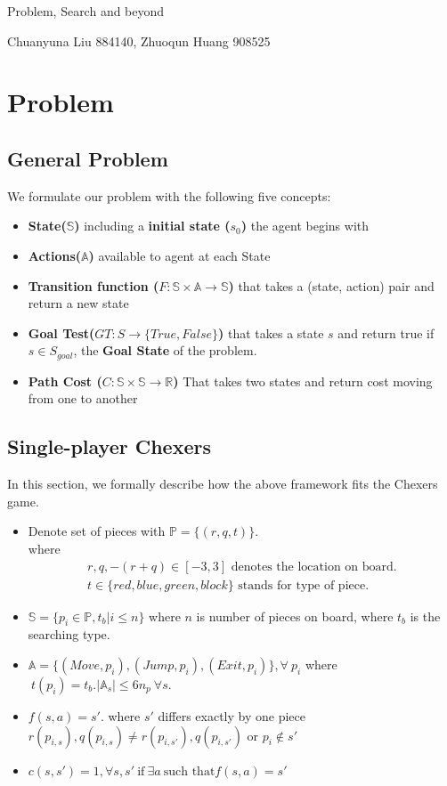 \documentclass[12pt,a4paper]{article}
\begin{document}
    \begin{center}
        \large Problem, Search and beyond
        
        \normalsize Chuanyuna Liu 884140, Zhuoqun Huang 908525
    \end{center}
    \section{Problem}
    \subsection{General Problem}
    We formulate our problem with the following five concepts:
    \begin{itemize}
        \item \textbf{State($\mathbb{S}$)} including a \textbf{initial state ($s_0$)} the agent begins with
        \item \textbf{Actions($\mathbb{A}$)} available to agent at each State
        \item \textbf{Transition function ($F:\mathbb{S}\times \mathbb{A}\rightarrow \mathbb{S}$)} that takes a (state, action) pair and return a new state
        \item \textbf{Goal Test($GT:S\rightarrow \{True, False\}$)} that takes a state $s$ and return true if $s\in S_{goal}$, the \textbf{Goal State} of the problem.
        \item \textbf{Path Cost ($C:\mathbb{S}\times \mathbb{S}\rightarrow \mathbb{R}$)} That takes two states and return cost moving from one to another
    \end{itemize}
    \subsection{Single-player Chexers}
    In this section, we formally describe how the above framework fits the Chexers game. 
    \begin{itemize}
        \item Denote set of pieces with $\mathbb{P}=\{(r, q, t)\}$. \\
        where
        \begin{align*}
            \text{$r, q, -(r+q)\in [-3, 3]$ denotes the location on board.}\\
            \text{$t\in \{red, blue, green, block\}$ stands for type of piece.}    
        \end{align*}
        
        \item $\mathbb{S} = \{p_i\in \mathbb{P}, t_b|i\le n\}$ where $n$ is number of pieces on board, where $t_b$ is the searching type.
        \item $\mathbb{A} = \{(Move,p_i), (Jump, p_i), (Exit, p_i)\}, \forall\ p_i $ where$\ t(p_i)=t_b. | \mathbb{A}_s| \le 6n_p\ \forall s$.
        \item $f(s, a) = s'$. where $s'$ differs exactly by one piece $r(p_{i,s}), q(p_{i,s}) \ne r(p_{i,s'}), q(p_{i,s'})$ or $p_i\notin s'$
        \item $c(s, s') = 1, \forall s, s'\ \text{if}\ \exists a\ \text{such that} f(s, a) = s'$
    \end{itemize}
    
\end{document}
